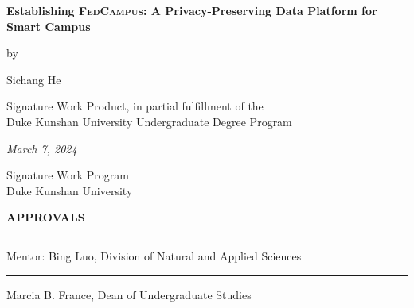\documentclass[11pt,a4paper,oneside]{report}
\newcommand{\fedcampus}{\textsc{FedCampus}\xspace}
\begin{document}
\newcommand{\authorname}{Sichang He}

\newcommand{\thetitle}{Establishing \fedcampus:
    A Privacy-Preserving Data Platform for Smart Campus
}

\newcommand{\submissiondate}{March 7, 2024}

\newcommand{\mentor}{Bing Luo}

\newcommand{\academicunit}{Division of Natural and Applied Sciences}



\begin{titlepage}

\vspace*{\bigskipamount}

\begin{center}
{\sffamily\LARGE\bfseries\MakeUppercase\thetitle\par}

\bigskip

by

\bigskip

{\Large \authorname}

\bigskip

Signature Work Product, in partial fulfillment of the \\
Duke Kunshan University Undergraduate Degree Program

\bigskip

\emph{\submissiondate}

\bigskip

Signature Work Program \\
Duke Kunshan University

\end{center}

\vfill

\textbf{\textsf{APPROVALS}}

\bigskip\bigskip\bigskip
\hrule

Mentor: \mentor, \academicunit

\bigskip\bigskip\bigskip
\hrule

Marcia B. France, Dean of Undergraduate Studies

\end{titlepage}
\end{document}
